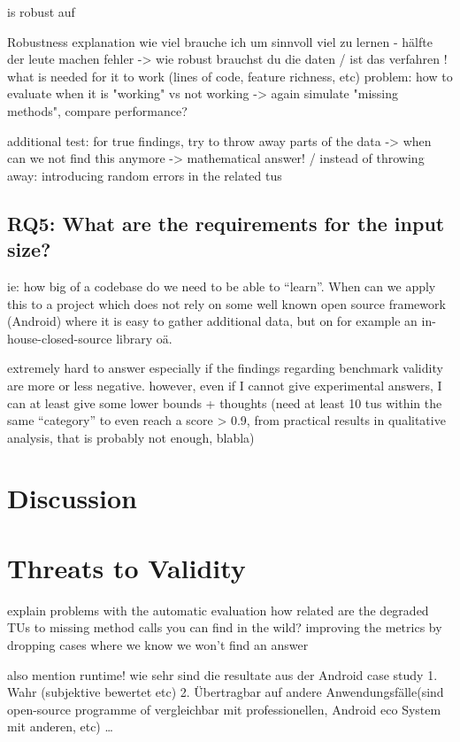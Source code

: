 is robust auf 

Robustness explanation
    wie viel brauche ich um sinnvoll viel zu lernen - hälfte der leute machen fehler -> wie robust brauchst du die daten / ist das verfahren !
    what is needed for it to work (lines of code, feature richness, etc) 
    problem: how to evaluate when it is "working" vs not working -> again simulate "missing methods", compare performance?

additional test:
	for true findings, try to throw away parts of the data -> when can we not find this anymore -> mathematical answer!
    / instead of throwing away: introducing random errors in the related tus

\subsection{RQ5: What are the requirements for the input size?}
ie: how big of a codebase do we need to be able to ``learn''. When can we apply this to a project which does not rely on some well known open source framework (Android) where it is easy to gather additional data, but on for example an in-house-closed-source library oä.

extremely hard to answer especially if the findings regarding benchmark validity are more or less negative.
however, even if I cannot give experimental answers, I can at least give some lower bounds + thoughts
(need at least 10 tus within the same ``category'' to even reach a score > 0.9, from practical results in qualitative analysis, that is probably not enough, blabla)

\section{Discussion}

\section{Threats to Validity}

explain problems with the automatic evaluation
how related are the degraded TUs to missing method calls you can find in the wild?
improving the metrics by dropping cases where we know we won't find an answer

also mention runtime!
wie sehr sind die resultate aus der Android case study 1. Wahr (subjektive bewertet etc) 2. Übertragbar auf andere Anwendungsfälle(sind open-source programme of vergleichbar mit professionellen, Android eco System mit anderen, etc)
\ldots
